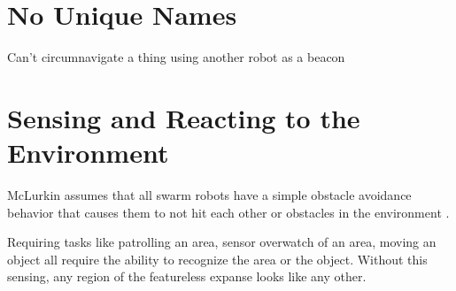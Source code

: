 \documentclass[]{article}
\begin{document}

\section{No Unique Names}

Can't circumnavigate a thing using another robot as a beacon

\section {Sensing and Reacting to the Environment}

McLurkin assumes that all swarm robots have a simple obstacle avoidance behavior that causes them to not hit each other or obstacles in the environment \cite{mclurkin2004stupid}.

Requiring tasks like patrolling an area, sensor overwatch of an area, moving an object all require the ability to recognize the area or the object. Without this sensing, any region of the featureless expanse looks like any other. 



\end{document}
